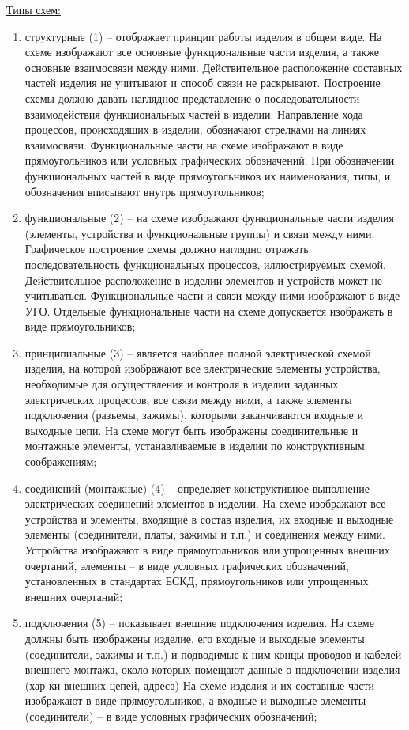 \documentclass[unicode, 12pt, a4paper, oneside]{article}
\begin{document}
\underline{Типы схем:}
\begin{enumerate}
\item структурные (1) – отображает принцип работы изделия в общем виде. На схеме изображают все основные функциональные части изделия, а также основные взаимосвязи между ними. Действительное расположение составных частей изделия не учитывают и способ связи не раскрывают. Построение схемы должно давать наглядное представление о последовательности взаимодействия функциональных частей в изделии. Направление хода процессов, происходящих в изделии, обозначают стрелками на линиях взаимосвязи. Функциональные части на схеме изображают в виде прямоугольников или условных графических обозначений. При обозначении функциональных частей в виде прямоугольников их наименования, типы, и обозначения вписывают внутрь прямоугольников;
\item функциональные (2) – на схеме изображают функциональные части изделия (элементы, устройства и функциональные группы) и связи между ними. Графическое построение схемы должно наглядно отражать последовательность функциональных процессов, иллюстрируемых схемой. Действительное расположение в изделии элементов и устройств может не учитываться. Функциональные части и связи между ними изображают в виде УГО. Отдельные функциональные части на схеме допускается изображать в виде прямоугольников;
\item принципиальные (3) – является наиболее полной электрической схемой изделия, на которой изображают все электрические элементы устройства, необходимые для осуществления и контроля в изделии заданных электрических процессов, все связи между ними, а также элементы подключения (разъемы, зажимы), которыми заканчиваются входные и выходные цепи. На схеме могут быть изображены соединительные и монтажные элементы, устанавливаемые в изделии по конструктивным соображениям;
\item соединений (монтажные) (4) – определяет конструктивное выполнение электрических соединений элементов в изделии. На схеме изображают все устройства и элементы, входящие в состав изделия, их входные и выходные элементы (соединители, платы, зажимы и т.п.) и соединения между ними. Устройства изображают в виде прямоугольников или упрощенных внешних очертаний, элементы – в виде условных графических обозначений, установленных в стандартах ЕСКД, прямоугольников или упрощенных внешних очертаний;
\item подключения (5) – показывает внешние подключения изделия. На схеме должны быть изображены изделие, его входные и выходные элементы (соединители, зажимы и т.п.) и подводимые к ним концы проводов и кабелей внешнего монтажа, около которых помещают данные о подключении изделия (хар-ки внешних цепей, адреса) На схеме изделия и их составные части изображают в виде прямоугольников, а входные и выходные элементы (соединители) – в виде условных графических обозначений;

\end{enumerate}
\end{document}
